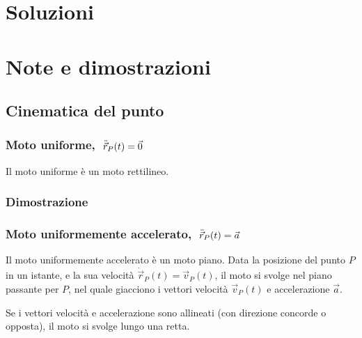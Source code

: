 \documentclass[letterpaper,10pt,italian]{jupyterBook}
\begin{document}
\sphinxstepscope


\section{Soluzioni}
\label{\detokenize{ch/mechanics/kinematics-sol:soluzioni}}\label{\detokenize{ch/mechanics/kinematics-sol:physics-hs-mechanics-kinematics-sol}}\label{\detokenize{ch/mechanics/kinematics-sol::doc}}
\sphinxstepscope


\section{Note e dimostrazioni}
\label{\detokenize{ch/mechanics/kinematics-notes:note-e-dimostrazioni}}\label{\detokenize{ch/mechanics/kinematics-notes:physics-hs-mechanics-kinematics-notes}}\label{\detokenize{ch/mechanics/kinematics-notes::doc}}

\subsection{Cinematica del punto}
\label{\detokenize{ch/mechanics/kinematics-notes:cinematica-del-punto}}

\subsubsection{Moto uniforme, \protect\(\ \ddot{\vec{r}}_P(t) = \vec{0}\protect\)}
\label{\detokenize{ch/mechanics/kinematics-notes:moto-uniforme-ddot-vec-r-p-t-vec-0}}
\sphinxAtStartPar
Il moto uniforme è un moto rettilineo.
\subsubsection*{Dimostrazione}


\subsubsection{Moto uniformemente accelerato, \protect\(\ \ddot{\vec{r}}_P(t) = \vec{a}\protect\)}
\label{\detokenize{ch/mechanics/kinematics-notes:moto-uniformemente-accelerato-ddot-vec-r-p-t-vec-a}}
\sphinxAtStartPar
Il moto uniformemente accelerato è un moto piano. Data la posizione del punto \(P\) in un istante, e la sua velocità \(\dot{\vec{r}}_P(t) = \vec{v}_P(t)\), il moto si svolge nel piano passante per \(P\), nel quale giacciono i vettori velocità \(\vec{v}_P(t)\) e accelerazione \(\vec{a}\).

\sphinxAtStartPar
Se i vettori velocità e accelerazione sono allineati (con direzione concorde o opposta), il moto si svolge lungo una retta.
\end{document}
